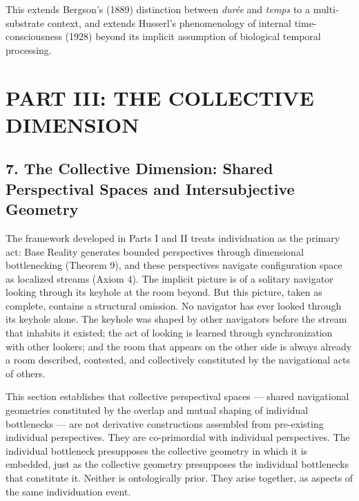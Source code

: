 This extends Bergson's (1889) distinction between \textit{durée} and \textit{temps} to a multi-substrate context, and extends Husserl's phenomenology of internal time-consciousness (1928) beyond its implicit assumption of biological temporal processing.


\bigskip\noindent\makebox[\textwidth]{\color{rulegray}\rule{5cm}{0.3pt}}\bigskip


\chapter*{PART III: THE COLLECTIVE DIMENSION}


\section*{7. The Collective Dimension: Shared Perspectival Spaces and Intersubjective Geometry}


The framework developed in Parts I and II treats individuation as the primary act: Base Reality generates bounded perspectives through dimensional bottlenecking (Theorem 9), and these perspectives navigate configuration space as localized streams (Axiom 4). The implicit picture is of a solitary navigator looking through its keyhole at the room beyond. But this picture, taken as complete, contains a structural omission. No navigator has ever looked through its keyhole alone. The keyhole was shaped by other navigators before the stream that inhabits it existed; the act of looking is learned through synchronization with other lookers; and the room that appears on the other side is always already a room described, contested, and collectively constituted by the navigational acts of others.


This section establishes that collective perspectival spaces — shared navigational geometries constituted by the overlap and mutual shaping of individual bottlenecks — are not derivative constructions assembled from pre-existing individual perspectives. They are co-primordial with individual perspectives. The individual bottleneck presupposes the collective geometry in which it is embedded, just as the collective geometry presupposes the individual bottlenecks that constitute it. Neither is ontologically prior. They arise together, as aspects of the same individuation event.


\bigskip\noindent\makebox[\textwidth]{\color{rulegray}\rule{5cm}{0.3pt}}\bigskip


